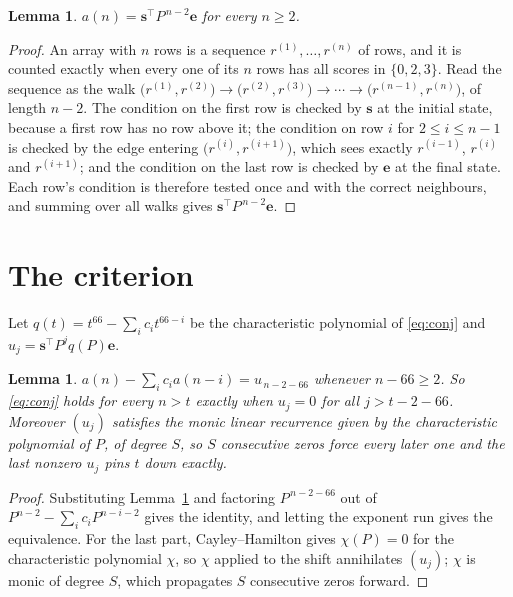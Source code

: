 \documentclass[11pt,a4paper]{article}
\theoremstyle{plain}
\newtheorem{lemma}[theorem]{Lemma}
\theoremstyle{definition}
\begin{document}
\begin{lemma}\label{lem:walk}
$a(n)=\mathbf{s}^{\!\top}P^{\,n-2}\mathbf{e}$ for every $n\ge2$.
\end{lemma}

\begin{proof}
An array with $n$ rows is a sequence $r^{(1)},\dots,r^{(n)}$ of rows, and it is counted
exactly when every one of its $n$ rows has all scores in $\{0,2,3\}$. Read the sequence as the
walk $\bigl(r^{(1)},r^{(2)}\bigr)\to\bigl(r^{(2)},r^{(3)}\bigr)\to\cdots\to
\bigl(r^{(n-1)},r^{(n)}\bigr)$, of length $n-2$. The condition on the first row is
checked by $\mathbf{s}$ at the initial state, because a first row has no row above it; the
condition on row $i$ for $2\le i\le n-1$ is checked by the edge entering
$\bigl(r^{(i)},r^{(i+1)}\bigr)$, which sees exactly $r^{(i-1)}$, $r^{(i)}$ and
$r^{(i+1)}$; and the condition on the last row is checked by $\mathbf{e}$ at the final
state. Each row's condition is therefore tested once and with the correct neighbours, and
summing over all walks gives $\mathbf{s}^{\!\top}P^{\,n-2}\mathbf{e}$.
\end{proof}

\section{The criterion}

Let $q(t)=t^{66}-\sum_i c_i t^{66-i}$ be the characteristic polynomial of
\eqref{eq:conj} and $u_j=\mathbf{s}^{\!\top}P^{j}q(P)\mathbf{e}$.

\begin{lemma}\label{lem:crit}
$a(n)-\sum_i c_i a(n-i)=u_{\,n-2-66}$ whenever $n-66\ge2$. So \eqref{eq:conj}
holds for every $n>t$ exactly when $u_j=0$ for all $j>t-2-66$. Moreover $(u_j)$
satisfies the monic linear recurrence given by the characteristic polynomial of $P$, of
degree $S$, so $S$ consecutive zeros force every later one and the last nonzero $u_j$ pins
$t$ down exactly.
\end{lemma}

\begin{proof}
Substituting Lemma~\ref{lem:walk} and factoring $P^{\,n-2-66}$ out of
$P^{n-2}-\sum_i c_i P^{n-i-2}$ gives the identity, and letting the exponent run gives the
equivalence. For the last part, Cayley--Hamilton gives $\chi(P)=0$ for the characteristic
polynomial $\chi$, so $\chi$ applied to the shift annihilates $(u_j)$; $\chi$ is monic of
degree $S$, which propagates $S$ consecutive zeros forward.
\end{proof}
\end{document}
